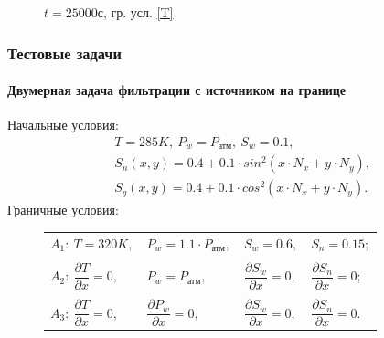 \begin{frame}
\begin{center}
\begin{figure}
\begin{minipage}{0.49\textwidth}
\vspace{-2mm}
\caption{$t=25000$с, гр. усл. \ref{T}}
\end{minipage}
\end{figure}
\end{center}
\end{frame}


\begin{frame}
\frametitle{Тестовые задачи}
\framesubtitle{Двумерная задача фильтрации с источником на границе}
\begin{center}
Начальные условия: 
\begin{equation*}
  \begin{aligned}
    &T=285K,\ P_w=P_\text{атм},\ S_w=0.1,\\
    &S_n(x, y)=0.4 + 0.1 \cdot sin^2(x \cdot N_x + y \cdot N_y),\\
    &S_g(x, y)=0.4 + 0.1 \cdot cos^2(x \cdot N_x + y \cdot N_y).
   \end{aligned}
\end{equation*}
Граничные условия:
\begin{figure}
\begin{minipage}[h]{0.24\textwidth}
\end{minipage}
\hfill
\begin{minipage}[h]{0.75\textwidth}
  \begin{tabular}{ l l l l }
    $A_1:\ T=320K,$ & $P_w=1.1\cdot P_{\text{атм}},$ & $S_w=0.6,$ & $S_n=0.15;$\\
      & & & \\
    $A_2:\ \dfrac{\partial{T}}{\partial{x}}=0,$ & ${P_w}=P_{\text{атм}},$ & $\dfrac{\partial{S_w}}{\partial{x}}=0,$ & $\dfrac{\partial{S_n}}{\partial{x}}=0;$\\
      & & & \\
    $A_3:\ \dfrac{\partial{T}}{\partial{x}}=0,$ & $\dfrac{\partial{P_w}}{\partial{x}}=0,$ & $\dfrac{\partial{S_w}}{\partial{x}}=0,$ & $\dfrac{\partial{S_n}}{\partial{x}}=0.$
  \end{tabular}
\end{minipage}
\end{figure}
\end{center}
\end{frame}


